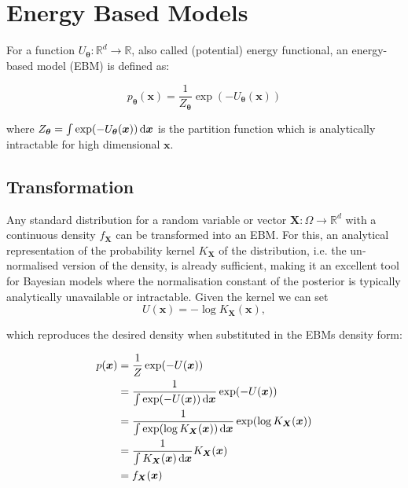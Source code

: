 

\begin{comment}
Let $\bm{x} \sim p_{\text{data}}(\bm{x})$ denote a training example, and $p_{\bm{\theta}}(\bm{x})$ denote a model’s probability density function 
that aims to approximates $p_{\text{data}}(\bm{x})$. 
\end{comment}


\section{Energy Based Models}

For a function $U_{\bm{\theta}} : \mathbb{R}^d \to \mathbb{R}$, also called (potential) energy functional, an energy-based model (EBM) is defined as:

\[
	p_{\bm{\theta}} (\bm{x}) = \frac{1}{ Z_{\bm{\theta}} } \exp( - U_{\bm{\theta}} (\bm{x}) )
\]

where $Z_{\bm{\theta}} = \int \exp( - U_{\bm{\theta}} (\bm{x}) ) \mathop{}\!\mathrm{d} \bm{x}$ is the partition function which is analytically intractable for high dimensional $\bm{x}$.



\subsection{Transformation}
Any standard distribution for a random variable or vector $\bm{X} : \Omega \to \mathbb{R}^d$ with a continuous density $f_{\bm{X}}$ can be transformed into an EBM.
For this, an analytical representation of the probability kernel $K_{\bm{X}}$ of the distribution, i.e. the un-normalised version of the density, is already sufficient, 
making it an excellent tool for Bayesian models where the normalisation constant of the posterior is typically analytically unavailable or intractable.
Given the kernel we can set 
\[
	U(\bm{x}) = - \log K_{\bm{X}} (\bm{x}),
\]

which reproduces the desired density when substituted in the EBMs density form:

\[
\begin{aligned}
	p (\bm{x}) &= \frac{1}{ Z } \exp( - U(\bm{x}) ) \\
	&= \frac{1}{ \int \exp( - U (\bm{x}) ) \mathop{}\!\mathrm{d} \bm{x} } \exp( - U(\bm{x}) ) \\
	&= \frac{1}{ \int \exp( \log K_{\bm{X}} (\bm{x}) ) \mathop{}\!\mathrm{d} \bm{x} } \exp( \log K_{\bm{X}} (\bm{x}) ) \\
	&= \frac{1}{ \int K_{\bm{X}} (\bm{x}) \mathop{}\!\mathrm{d} \bm{x} } K_{\bm{X}} (\bm{x}) \\
	&= f_{\bm{X}} (\bm{x}) \\
\end{aligned}
\]



